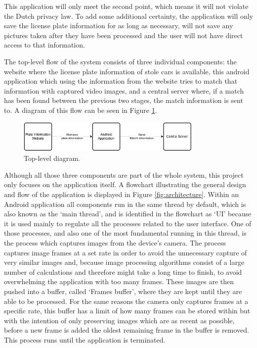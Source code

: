 This application will only meet the second point, which means it will not violate the Dutch privacy law. To add some additional certainty, the application will only save the license plate information for as long as necessary, will not save any pictures taken after they have been processed and the user will not have direct access to that information.

The top-level flow of the system consists of three individual components: the website where the license plate information of stole cars is available, this android application which using the information from the website tries to match that information with captured video images, and a central server where, if a match has been found between the previous two stages, the match information is sent to. A diagram of this flow can be seen in Figure \ref{fig:top-level}.

\begin{figure}[ht]
    \centering
    \includegraphics[width=0.8\textwidth]{plaatjes/top-down}
    \caption{Top-level diagram.}
    \label{fig:top-level}
\end{figure}%

Although all those three components are part of the whole system, this project only focuses on the application itself. A flowchart illustrating the general design and flow of the application is displayed in Figure \ref{fig:architecture}. Within an Android application all components run in the same thread by default, which is also known as the `main thread', and is identified in the flowchart as `UI' because it is used mainly to regulate all the processes related to the user interface. One of those processes, and also one of the most fundamental running in this thread, is the process which captures images from the device's camera. The process captures image frames at a set rate in order to avoid the unnecessary capture of very similar images and, because image processing algorithms consist of a large number of calculations and therefore might take a long time to finish, to avoid overwhelming the application with too many frames. These images are then pushed into a buffer, called `Frames buffer', where they are kept until they are able to be processed. For the same reasons the camera only captures frames at a specific rate, this buffer has a limit of how many frames can be stored within but with the intention of only preserving images which are as recent as possible, before a new frame is added the oldest remaining frame in the buffer is removed. This process runs until the application is terminated.

